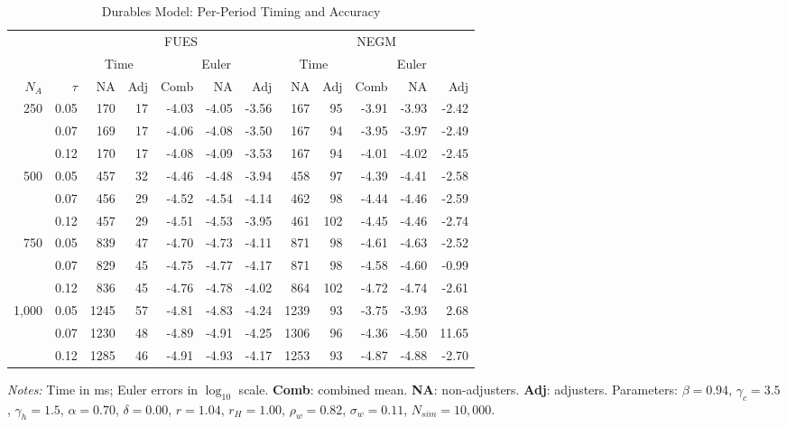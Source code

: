 \documentclass[11pt]{article}
\begin{document}
\pagestyle{empty}
\begin{table}[htbp]
\centering
\begingroup
\small
\setlength{\tabcolsep}{3pt}
\renewcommand{\arraystretch}{1.05}
\caption{Durables Model: Per-Period Timing and Accuracy}
\label{table:housing1}
\begin{tabular}{@{}rr rrrrr rrrrr@{}}
\toprule
& & \multicolumn{5}{c}{FUES} & \multicolumn{5}{c}{NEGM} \\
\cmidrule(lr){3-7} \cmidrule(lr){8-12}
& & \multicolumn{2}{c}{Time} & \multicolumn{3}{c}{Euler} & \multicolumn{2}{c}{Time} & \multicolumn{3}{c}{Euler} \\
\cmidrule(lr){3-4} \cmidrule(lr){5-7} \cmidrule(lr){8-9} \cmidrule(lr){10-12}
$N_A$ & $\tau$ & NA & Adj & Comb & NA & Adj & NA & Adj & Comb & NA & Adj \\
\midrule
250 & 0.05 & 170 & 17 & -4.03 & -4.05 & -3.56 & 167 & 95 & -3.91 & -3.93 & -2.42 \\
 & 0.07 & 169 & 17 & -4.06 & -4.08 & -3.50 & 167 & 94 & -3.95 & -3.97 & -2.49 \\
 & 0.12 & 170 & 17 & -4.08 & -4.09 & -3.53 & 167 & 94 & -4.01 & -4.02 & -2.45 \\
\midrule
500 & 0.05 & 457 & 32 & -4.46 & -4.48 & -3.94 & 458 & 97 & -4.39 & -4.41 & -2.58 \\
 & 0.07 & 456 & 29 & -4.52 & -4.54 & -4.14 & 462 & 98 & -4.44 & -4.46 & -2.59 \\
 & 0.12 & 457 & 29 & -4.51 & -4.53 & -3.95 & 461 & 102 & -4.45 & -4.46 & -2.74 \\
\midrule
750 & 0.05 & 839 & 47 & -4.70 & -4.73 & -4.11 & 871 & 98 & -4.61 & -4.63 & -2.52 \\
 & 0.07 & 829 & 45 & -4.75 & -4.77 & -4.17 & 871 & 98 & -4.58 & -4.60 & -0.99 \\
 & 0.12 & 836 & 45 & -4.76 & -4.78 & -4.02 & 864 & 102 & -4.72 & -4.74 & -2.61 \\
\midrule
1,000 & 0.05 & 1245 & 57 & -4.81 & -4.83 & -4.24 & 1239 & 93 & -3.75 & -3.93 & 2.68 \\
 & 0.07 & 1230 & 48 & -4.89 & -4.91 & -4.25 & 1306 & 96 & -4.36 & -4.50 & 11.65 \\
 & 0.12 & 1285 & 46 & -4.91 & -4.93 & -4.17 & 1253 & 93 & -4.87 & -4.88 & -2.70 \\
\bottomrule
\end{tabular}
\vspace{0.3em}
\par\small \textit{Notes:} Time in ms; Euler errors in $\log_{10}$ scale. \textbf{Comb}: combined mean. \textbf{NA}: non-adjusters. \textbf{Adj}: adjusters. Parameters: $\beta=0.94$, $\gamma_c=3.5$, $\gamma_h=1.5$, $\alpha=0.70$, $\delta=0.00$, $r=1.04$, $r_H=1.00$, $\rho_w=0.82$, $\sigma_w=0.11$, $N_{sim}=10{,}000$.
\endgroup
\end{table}
\end{document}
